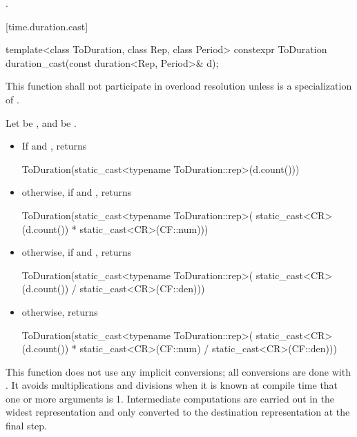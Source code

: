 \begin{itemdescr}
\pnum
\returns {}.
\end{itemdescr}

[time.duration.cast]{}

%
%
\begin{itemdecl}
template<class ToDuration, class Rep, class Period>
  constexpr ToDuration duration_cast(const duration<Rep, Period>& d);
\end{itemdecl}

\begin{itemdescr}
\pnum
\remarks This function shall not participate in overload resolution
unless  is a specialization of .

\pnum
\returns Let  be , and  be .
\begin{itemize}
\item If  and , returns
\begin{codeblock}
ToDuration(static_cast<typename ToDuration::rep>(d.count()))
\end{codeblock}

\item otherwise, if  and , returns
\begin{codeblock}
ToDuration(static_cast<typename ToDuration::rep>(
  static_cast<CR>(d.count()) * static_cast<CR>(CF::num)))
\end{codeblock}

\item otherwise, if  and , returns
\begin{codeblock}
ToDuration(static_cast<typename ToDuration::rep>(
  static_cast<CR>(d.count()) / static_cast<CR>(CF::den)))
\end{codeblock}

\item otherwise, returns
\begin{codeblock}
ToDuration(static_cast<typename ToDuration::rep>(
  static_cast<CR>(d.count()) * static_cast<CR>(CF::num) / static_cast<CR>(CF::den)))
\end{codeblock}
\end{itemize}

\pnum
\begin{note}
This function does not use any implicit conversions; all conversions
are done with . It avoids multiplications and divisions when
it is known at compile time that one or more arguments is 1. Intermediate
computations are carried out in the widest representation and only converted to
the destination representation at the final step.
\end{note}
\end{itemdescr}

